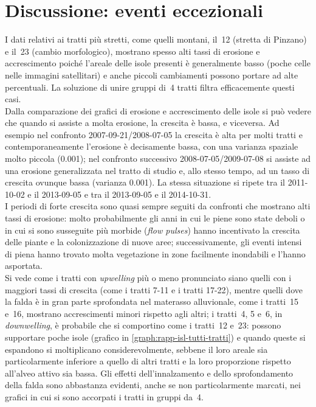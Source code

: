 \section{Discussione: eventi eccezionali}
I dati relativi ai tratti più stretti, come quelli montani, il~12 (stretta di Pinzano) e il~23 (cambio morfologico), mostrano spesso alti tassi di erosione e accrescimento poiché l'areale delle isole presenti è generalmente basso (poche celle nelle immagini satellitari) e anche piccoli cambiamenti possono portare ad alte percentuali.
La soluzione di unire gruppi di~4 tratti filtra efficacemente questi casi.
\\
Dalla comparazione dei grafici di erosione e accrescimento delle isole si può vedere che quando si assiste a molta erosione, la crescita è bassa, e viceversa.
Ad esempio nel confronto 2007-09-21/2008-07-05 la crescita è alta per molti tratti e contemporaneamente l'erosione è decisamente bassa, con una varianza spaziale molto piccola (\num{0.001}); nel confronto successivo 2008-07-05/2009-07-08 si assiste ad una erosione generalizzata nel tratto di studio e, allo stesso tempo, ad un tasso di crescita ovunque bassa (varianza \num{0.001}).
La stessa situazione si ripete tra il 2011-10-02 e il 2013-09-05 e tra il 2013-09-05 e il 2014-10-31.
\\
I periodi di forte crescita sono quasi sempre seguiti da confronti che mostrano alti tassi di erosione: molto probabilmente gli anni in cui le piene sono state deboli o in cui si sono susseguite più morbide (\emph{flow pulses}) hanno incentivato la crescita delle piante e la colonizzazione di nuove aree; successivamente, gli eventi intensi di piena hanno trovato molta vegetazione in zone facilmente inondabili e l'hanno asportata.
\\
Si vede come i tratti con \emph{upwelling} più o meno pronunciato siano quelli con i maggiori tassi di crescita (come i tratti 7-11 e i tratti 17-22), mentre quelli dove la falda è in gran parte sprofondata nel materasso alluvionale, come i tratti~15 e~16, mostrano accrescimenti minori rispetto agli altri;
i tratti~4, 5 e~6, in \emph{downwelling}, è probabile che si comportino come i tratti~12 e~23: possono supportare poche isole (grafico in \cref{graph:rapp-isl-tutti-tratti}) e quando queste si espandono si moltiplicano considerevolmente, sebbene il loro areale sia particolarmente inferiore a quello di altri tratti e la loro proporzione rispetto all'alveo attivo sia bassa.
Gli effetti dell'innalzamento e dello sprofondamento della falda sono abbastanza evidenti, anche se non particolarmente marcati, nei grafici in cui si sono accorpati i tratti in gruppi da~4.
